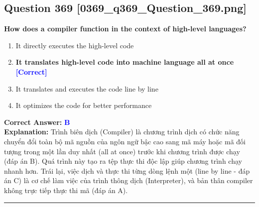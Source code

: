 \documentclass[11pt,a4paper]{article}
\begin{document}
\begin{minipage}{\textwidth}
\subsection*{Question 369 \quad \footnotesize{[0369\_q369\_Question\_369.png]}}
\noindent \textbf{How does a compiler function in the context of high-level languages?}

\begin{enumerate}[label=\Alph*.]
    \item It directly executes the high-level code
    \item \textbf{It translates high-level code into machine language all at once} \hfill \textcolor{blue}{\textbf{[Correct]}}
    \item It translates and executes the code line by line
    \item It optimizes the code for better performance
\end{enumerate}

\noindent \textbf{Correct Answer:} \textcolor{blue}{\textbf{B}} \\[2pt]
\noindent \textbf{Explanation:} Trình biên dịch (Compiler) là chương trình dịch có chức năng chuyển đổi toàn bộ mã nguồn của ngôn ngữ bậc cao sang mã máy hoặc mã đối tượng trong một lần duy nhất (all at once) trước khi chương trình được chạy (đáp án B). Quá trình này tạo ra tệp thực thi độc lập giúp chương trình chạy nhanh hơn. Trái lại, việc dịch và thực thi từng dòng lệnh một (line by line - đáp án C) là cơ chế làm việc của trình thông dịch (Interpreter), và bản thân compiler không trực tiếp thực thi mã (đáp án A).

\par\vspace{0.3cm}
\hrule
\vspace{0.3cm}
\end{minipage}
\end{document}
